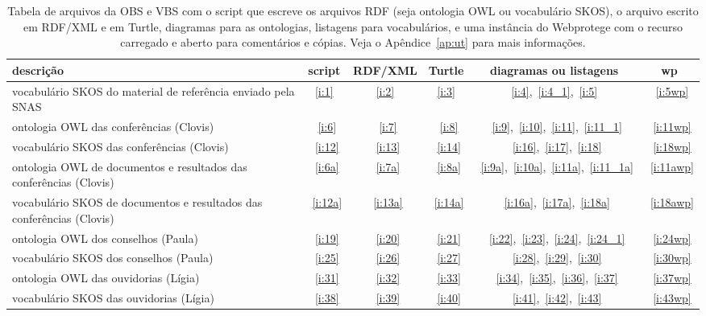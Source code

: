 \documentclass[12pt]{article}
\begin{document}
\begin{table}[htpq!]
\vspace{-1cm}
\centering
\caption{Tabela de arquivos da OBS e VBS com o script que escreve os arquivos RDF (seja ontologia OWL ou vocabulário SKOS), o arquivo escrito em RDF/XML e em Turtle, diagramas para as ontologias, listagens para vocabulários, e uma instância do Webprotege com o recurso carregado e aberto para comentários e cópias. Veja o Apêndice~\ref{ap:ut} para mais informações.}
\begin{tabular}{| p{6cm} | c | c | c | c | c | }\hline
 {\bf descrição} & {\bf script} & {\bf RDF/XML} & {\bf Turtle} & {\bf diagramas ou listagens} & {\bf wp} \\\hline\hline
vocabulário SKOS do material de referência enviado pela SNAS  & \ref{i:1} & \ref{i:2} & \ref{i:3} & \ref{i:4},~\ref{i:4_1},~\ref{i:5} &~\ref{i:5wp} \\\hline\hline
ontologia OWL das conferências (Clovis) &~\ref{i:6}&~\ref{i:7}&~\ref{i:8}&~\ref{i:9},~\ref{i:10},~\ref{i:11},~\ref{i:11_1}&~\ref{i:11wp} \\
vocabulário SKOS das conferências (Clovis) &~\ref{i:12}&~\ref{i:13}&~\ref{i:14}&~\ref{i:16},~\ref{i:17},~\ref{i:18}&~\ref{i:18wp} \\\hline\hline

ontologia OWL  de documentos e resultados das conferências (Clovis) &~\ref{i:6a}&~\ref{i:7a}&~\ref{i:8a}&~\ref{i:9a},~\ref{i:10a},~\ref{i:11a},~\ref{i:11_1a}&~\ref{i:11awp} \\
vocabulário SKOS de documentos e resultados das conferências (Clovis) &~\ref{i:12a}&~\ref{i:13a}&~\ref{i:14a}&~\ref{i:16a},~\ref{i:17a},~\ref{i:18a}&~\ref{i:18awp} \\\hline\hline

ontologia OWL dos conselhos (Paula) &~\ref{i:19}&~\ref{i:20}&~\ref{i:21}&~\ref{i:22},~\ref{i:23},~\ref{i:24},~\ref{i:24_1}&~\ref{i:24wp} \\
vocabulário SKOS dos conselhos (Paula) &~\ref{i:25}&~\ref{i:26}&~\ref{i:27}&~\ref{i:28},~\ref{i:29},~\ref{i:30}&~\ref{i:30wp} \\\hline\hline

ontologia   OWL das  ouvidorias (Lígia) &~\ref{i:31}&~\ref{i:32}&~\ref{i:33}&~\ref{i:34},~\ref{i:35},~\ref{i:36},~\ref{i:37}&~\ref{i:37wp} \\
vocabulário SKOS das ouvidorias (Lígia) &~\ref{i:38}&~\ref{i:39}&~\ref{i:40}&~\ref{i:41},~\ref{i:42},~\ref{i:43}&~\ref{i:43wp} \\\hline\hline


\end{tabular}
\end{table}
\end{document}
